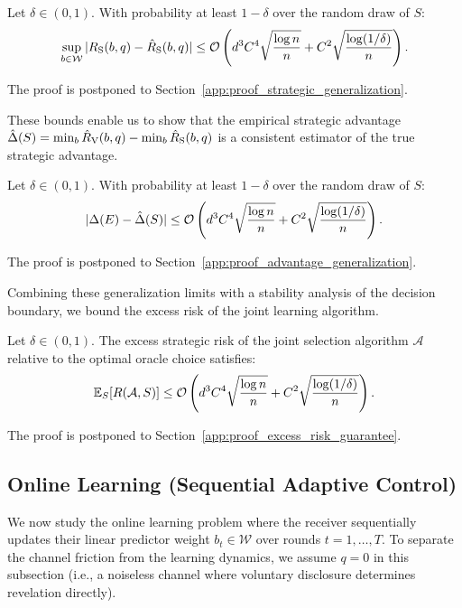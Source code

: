 \begin{lemma}
\label{lem:strategic_generalization}
Let $\delta \in (0, 1)$. With probability at least $1 - \delta$ over the random draw of $S$:
\begin{equation}
    \label{eq:strategic_gen_bound}
    \sup_{b \in \mathcal{W}} |R_{\mathrm{S}}(b, q) - \hat{R}_{\mathrm{S}}(b, q)| \le \mathcal{O}\left( d^3 C^4 \sqrt{\frac{\log n}{n}} + C^2 \sqrt{\frac{\log(1/\delta)}{n}} \right).
\end{equation}
\end{lemma}
The proof is postponed to Section~\ref{app:proof_strategic_generalization}.

These bounds enable us to show that the empirical strategic advantage $\hat{\Delta}(S) = \min_{b} \hat{R}_{\mathrm{V}}(b, q) - \min_{b} \hat{R}_{\mathrm{S}}(b, q)$ is a consistent estimator of the true strategic advantage.
\begin{theorem}
\label{thm:advantage_generalization}
Let $\delta \in (0, 1)$. With probability at least $1 - \delta$ over the random draw of $S$:
\begin{equation}
    \label{eq:advantage_gen_bound}
    |\Delta(E) - \hat{\Delta}(S)| \le \mathcal{O}\left( d^3 C^4 \sqrt{\frac{\log n}{n}} + C^2 \sqrt{\frac{\log(1/\delta)}{n}} \right).
\end{equation}
\end{theorem}
The proof is postponed to Section~\ref{app:proof_advantage_generalization}.

Combining these generalization limits with a stability analysis of the decision boundary, we bound the excess risk of the joint learning algorithm.
\begin{theorem}
\label{thm:excess_risk_guarantee}
Let $\delta \in (0, 1)$. The excess strategic risk of the joint selection algorithm $\mathcal{A}$ relative to the optimal oracle choice satisfies:
\begin{equation}
    \label{eq:excess_risk_bound}
    \mathbb{E}_S[R(\mathcal{A}, S)] \le \mathcal{O}\left( d^3 C^4 \sqrt{\frac{\log n}{n}} + C^2 \sqrt{\frac{\log(1/\delta)}{n}} \right).
\end{equation}
\end{theorem}
The proof is postponed to Section~\ref{app:proof_excess_risk_guarantee}.

\subsection{Online Learning (Sequential Adaptive Control)}
\label{sec:regression_online}
We now study the online learning problem where the receiver sequentially updates their linear predictor weight $b_t \in \mathcal{W}$ over rounds $t = 1, \dots, T$. To separate the channel friction from the learning dynamics, we assume $q = 0$ in this subsection (i.e., a noiseless channel where voluntary disclosure determines revelation directly).

